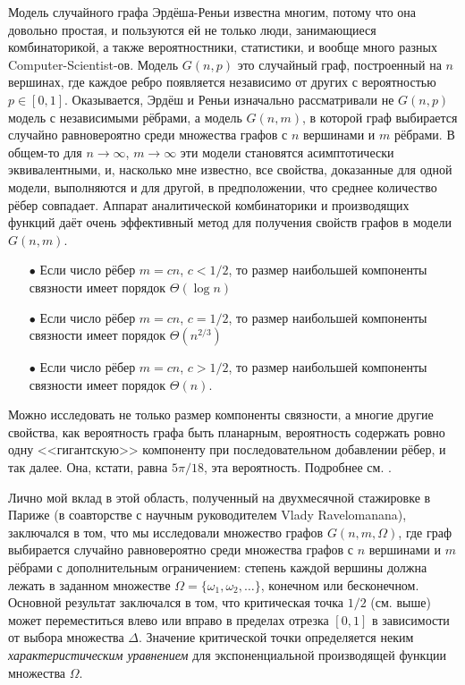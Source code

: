 \documentclass[a5paper]{article}
\theoremstyle{definition}
\begin{document}
Модель случайного графа Эрдёша-Реньи известна многим, потому что она довольно 
простая, и пользуются ей не только люди, занимающиеся комбинаторикой, а также 
вероятностники, статистики, и вообще много разных Computer-Scientist-ов. 
Модель \( G(n,p) \) это случайный граф, построенный на \( n \) вершинах, где 
каждое ребро появляется независимо от других с вероятностью \( p \in [0, 1] \).
Оказывается, Эрдёш и Реньи изначально рассматривали не \( G(n,p) \) модель с 
независимыми 
рёбрами, а модель \( G(n,m) \), в которой граф выбирается случайно 
равновероятно среди множества графов с \( n \) вершинами и \( m \) рёбрами. В 
общем-то для \( n \to \infty \), \( m \to \infty \) эти модели становятся 
асимптотически эквивалентными, и, насколько мне известно, все свойства, 
доказанные для одной модели, выполняются и для другой, в предположении, что 
среднее количество рёбер совпадает.
Аппарат аналитической комбинаторики и производящих функций даёт очень 
эффективный метод для получения свойств графов в модели \( G(n,m) \).
\begin{enumerate}
\item[\( \bullet \)] Если число рёбер \( m  = c n \), \( c < 1/2 \), то размер 
наибольшей компоненты связности имеет порядок \( \Theta(\log n) \)
\item[\( \bullet \)] Если число рёбер \( m  = c n \), \( c = 1/2 \), то размер 
наибольшей компоненты связности имеет порядок \( \Theta(n^{2/3}) \)
\item[\( \bullet \)] Если число рёбер \( m  = c n \), \( c > 1/2 \), то размер 
наибольшей компоненты связности имеет порядок \( \Theta(n) \).
\end{enumerate}
Можно исследовать не только размер компоненты связности, а многие другие 
свойства, как вероятность графа быть планарным, вероятность содержать ровно 
одну <<гигантскую>> компоненту при последовательном добавлении рёбер, и так 
далее. Она, кстати, равна \( 5\pi / 18 \), эта вероятность. Подробнее см. 
\cite{giant_component}.

Лично мой вклад в этой область, полученный на двухмесячной стажировке в 
Париже (в соавторстве с научным руководителем Vlady Ravelomanana), заключался в 
том, что мы исследовали множество графов \( G(n,m,\Omega) 
\), где граф выбирается случайно равновероятно среди множества графов с \( n \) 
вершинами и \( m \) рёбрами с дополнительным ограничением: степень каждой 
вершины должна лежать в заданном множестве \( \Omega = \{\omega_1, \omega_2, 
\ldots \} 
\), конечном или бесконечном. Основной результат заключался в том, что 
критическая точка \( 1/2 \) (см. выше) может переместиться влево или вправо в 
пределах отрезка \( [0, 1] \) в зависимости от выбора множества \( \Delta \). 
Значение критической точки определяется неким  \textit{характеристическим 
уравнением} для экспоненциальной производящей функции множества \( \Omega \).
\end{document}

